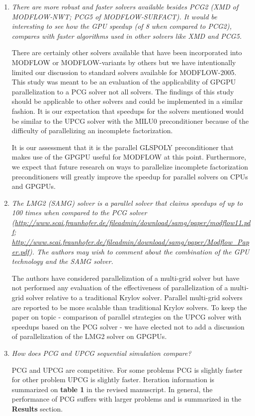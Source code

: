 \documentclass[12pt]{article} %
\begin{document}
\begin{enumerate}
\item \textit{There are more robust and faster solvers available besides PCG2 (XMD of MODFLOW‐NWT; PCG5 of MODFLOW‐SURFACT). It would be interesting to see how the GPU speedup (of 8 when compared to PCG2), compares with faster algorithms used in other solvers like XMD and PCG5.}

There are certainly other solvers available that have been incorporated into MODFLOW or MODFLOW-variants by others but we have intentionally limited our discussion to standard solvers available for MODFLOW-2005. This study was meant to be an evaluation of the applicability of GPGPU parallelization to a PCG solver not all solvers. The findings of this study should be applicable to other solvers and could be implemented in a similar fashion. It is our expectation that speedups for the solvers mentioned would be similar to the UPCG solver with the MILU0 preconditioner because of the difficulty of parallelizing an incomplete factorization.

It is our assessment that it is the parallel GLSPOLY preconditioner that makes use of the GPGPU useful for MODFLOW at this point. Furthermore, we expect that future research on ways to parallelize incomplete factorization preconditioners will greatly improve the speedup for parallel solvers on CPUs and GPGPUs.

\item \textit{The LMG2 (SAMG) solver is a parallel solver that claims speedups of up to 100 times when compared to the PCG solver  (\url{http://www.scai.fraunhofer.de/fileadmin/download/samg/paper/modflow11.pdf}; \url{http://www.scai.fraunhofer.de/fileadmin/download/samg/paper/Modflow_Paper.pdf}). The authors may wish to comment about the combination of the GPU technology and the SAMG
solver.}
	
The authors have considered parallelization of a multi-grid solver but have not performed any evaluation of the effectiveness of parallelization of a multi-grid solver relative to a traditional Krylov solver. Parallel multi-grid solvers are reported to be more scalable than traditional Krylov solvers. To keep the paper on topic - comparison of parallel strategies on the UPCG solver with speedups based on the PCG solver - we have elected not to add a discussion of parallelization of the LMG2 solver on GPGPUs.

\item \textit{How does PCG and UPCG sequential simulation compare?}

PCG and UPCG are competitive. For some problems PCG is slightly faster for other problem UPCG is slightly faster. Iteration information is summarized on \textbf{table 1} in the revised manuscript. In general, the performance of PCG suffers with larger problems and is summarized in the \textbf{Results} section.


\end{enumerate}
\end{document}
